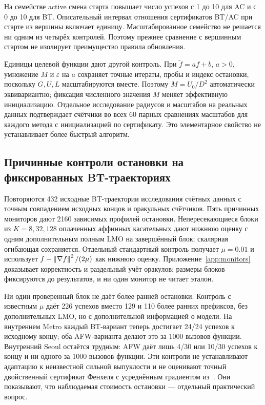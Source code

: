 
На семействе active смена старта повышает число успехов с 1 до 10
для AC и с 0 до 10 для BT. Описательный интервал отношения
сертификатов BT/AC при старте из вершины включает единицу.
Масштабированное семейство не решается ни одним из четырёх контролей.
Поэтому прежнее сравнение с вершинным стартом не изолирует преимущество
правила обновления.

Единицы целевой функции дают другой контроль. При
$\widetilde f=af+b$, $a>0$, умножение $M$ и $\varepsilon$ на $a$
сохраняет точные итераты, пробы и индекс остановки, поскольку
$G,U,L$ масштабируются вместе. Поэтому $M=U_0/D^2$ автоматически
эквивариантно; фиксация численного значения $M$ меняет эффективную
инициализацию. Отдельное исследование радиусов и масштабов на реальных
данных подтверждает счётчики во всех 60 парных сравнениях масштабов
для каждого метода с инициализацией по сертификату. Это элементарное
свойство не устанавливает более быстрый алгоритм.

\subsection{Причинные контроли остановки на фиксированных BT-траекториях}
Повторяются 432 исходные BT-траектории исследования счётных данных
с точным совпадением исходных концов и оракульных счётчиков.
Пять причинных мониторов дают 2160 зависимых профилей остановки.
Непересекающиеся блоки из $K=8,32,128$ оплаченных аффинных касательных
дают нижнюю оценку с одним дополнительным полным LMO на завершённый
блок; скалярная огибающая сохраняется. Отдельный стандартный контроль
получает $\mu=0.01$ и использует
$f-\left\|\nabla f\right\|^2/(2\mu)$ как нижнюю оценку.
Приложение~\ref{app:monitors} доказывает корректность и раздельный
учёт оракулов; размеры блоков фиксируются до результатов, и ни один
монитор не читает эталон.


Ни один проверенный блок не даёт более ранней остановки.
Контроль с известным $\mu$ даёт 226 успехов вместо 129 и 110 более
ранних префиксов, без дополнительных LMO, но с дополнительной
информацией о модели. На внутреннем Metro каждый BT-вариант теперь
достигает 24/24 успехов к исходному концу; оба AFW-варианта делают
это за 1000 вызовов функции. Внутренний Seoul остаётся трудным:
AFW даёт лишь 4/30 или 10/30 успехов к концу и ни одного за
1000 вызовов функции. Эти контроли не устанавливают адаптацию к
неизвестной сильной выпуклости и не оценивают точный двойственный
сертификат Фенхеля с усреднённым градиентом из~\cite{pedregosa}.
Они показывают, что наблюдаемая стоимость остановки — отдельный
практический вопрос.
